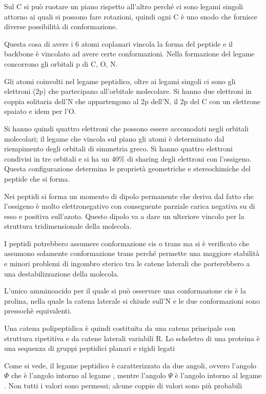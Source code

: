 Sul C\ped{\alpha} si può ruotare un piano rispetto all'altro perché
ci sono legami singoli attorno ai quali si possono fare rotazioni,
quindi ogni C\ped{\alpha} è uno snodo che fornisce diverse
possibilità di conformazione.

Questa cosa di avere i 6 atomi coplanari vincola la forma del peptide e il backbone è vincolato ad avere certe conformazioni.
Nella formazione del legame concorrono gli orbitali p di C, O, N.

Gli atomi coinvolti nel legame peptidico, oltre ai legami singoli ci
sono gli elettroni \pi{} (2p) che partecipano all'orbitale molecolare.
Si hanno due elettroni in coppia solitaria dell'N che appartengono al 2p dell'N, il 2p del C con un elettrone spaiato e idem per l'O.

Si hanno quindi quattro elettroni che possono essere accomodati negli orbitali
molecolari; il legame \pi{} che vincola sul piano gli atomi è determinato
dal riempimento degli orbitali di simmetria \pi{} greco.
Si hanno quattro elettroni condivisi in tre orbitali e si ha un 40\% di sharing degli elettroni con l'ossigeno.
Questa configurazione determina le proprietà geometriche e stereochimiche del peptide che si forma.

Nei peptidi si forma un momento di dipolo permanente che deriva dal
fatto che l'ossigeno è molto elettronegativo con conseguente parziale
carica negativa su di esso e positiva sull'azoto.
Questo dipolo va a dare un ulteriore vincolo per la struttura tridimensionale della molecola.

I peptidi potrebbero assumere conformazione cis o trans ma si è
verificato che assumono solamente conformazione trans perché permette
una maggiore stabilità e minori problemi di ingombro sterico tra le
catene laterali che porterebbero a una destabilizzazione della molecola.

L'unico amminoacido per il quale si può osservare una conformazione cis è la prolina, nella quale la catena laterale si chiude sull'N e le due conformazioni sono pressochè equivalenti.

Una catena polipeptidica è quindi costituita da una catena principale
con struttura ripetitiva e da catene laterali variabili
R.
Lo scheletro di una proteina è una sequenza di gruppi peptidici planari e rigidi legati

Come si vede, il legame peptidico è caratterizzato da due angoli, ovvero
l'angolo \(\Phi\) che è l'angolo intorno al legame ,
mentre l'angolo \(\Psi\) è l'angolo intorno al legame .
Non tutti i valori sono permessi; alcune coppie di valori sono più
probabili

